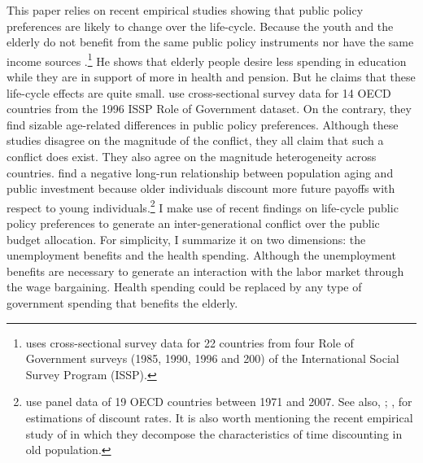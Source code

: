 \documentclass[
]{article}
\begin{document}
This paper relies on recent empirical studies showing that public policy preferences are likely to change over the life-cycle. Because the youth and the elderly do not benefit from the same public policy instruments nor have the same income sources \citep[see, for example,][]{Busemeyer2009, Sorensen2013}.\footnote{\citet{Sorensen2013} uses cross-sectional survey data for 22 countries from four Role of Government surveys (1985, 1990, 1996 and 200) of the International Social Survey Program (ISSP).} He shows that elderly people desire less spending in education while they are in support of more in health and pension. But he claims that these life-cycle effects are quite small. \citet{Busemeyer2009} use cross-sectional survey data for 14 OECD countries from the 1996 ISSP Role of Government dataset. On the contrary, they find sizable age-related differences in public policy preferences. Although these studies disagree on the magnitude of the conflict, they all claim that such a conflict does exist. They also agree on the magnitude heterogeneity across countries. \citet{Jager2016} find a negative long-run relationship between population aging and public investment because older individuals discount more future payoffs with respect to young individuals.\footnote{\citet{Jager2016} use panel data of 19 OECD countries between 1971 and 2007. See also, \citet{Harrison2002}; \citet{Read2004}, for estimations of discount rates. It is also worth mentioning the recent empirical study of \citet{Huffman2017} in which they decompose the characteristics of time discounting in old population.}
I make use of recent findings on life-cycle public policy preferences to generate an inter-generational conflict over the public budget allocation. For simplicity, I summarize it on two dimensions: the unemployment benefits and the health spending. Although the unemployment benefits are necessary to generate an interaction with the labor market through the wage bargaining. Health spending could be replaced by any type of government spending that benefits the elderly.
\end{document}
